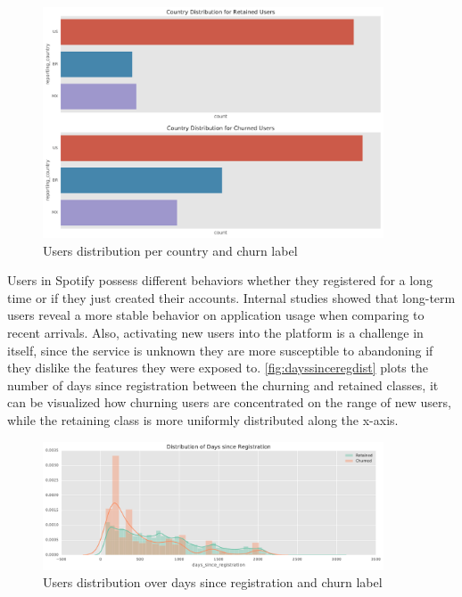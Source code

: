 \documentclass{kththesis}
\begin{document}
	\begin{figure}[H]
    \centering
    \includegraphics[width=0.9\textwidth,height=0.9\textheight,keepaspectratio]{figures/dist_reporting_country.pdf}
    \caption{Users distribution per country and churn label}
    \label{fig:countrydist}
	\end{figure}

Users in Spotify possess different behaviors whether they registered for a long time or if they just created their accounts. Internal studies showed that long-term users reveal a more stable behavior on application usage when comparing to recent arrivals. Also, activating new users into the platform is a challenge in itself, since the service is unknown they are more susceptible to abandoning if they dislike the features they were exposed to. \autoref{fig:dayssinceregdist} plots the number of days since registration between the churning and retained classes, it can be visualized how churning users are concentrated on the range of new users, while the retaining class is more uniformly distributed along the x-axis.

	\begin{figure}[h]
    \centering
    \includegraphics[width=0.9\textwidth,height=0.9\textheight,keepaspectratio]{figures/dist_dayssincereg.pdf}
    \caption{Users distribution over days since registration and churn label}
    \label{fig:dayssinceregdist}
	\end{figure}
\end{document}
